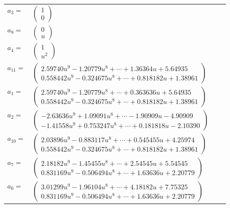 \documentclass[1p]{elsarticle_modified}
\theoremstyle{definition}
\begin{document}
\begin{tabular}{m{7pt} m{180pt} m{7pt} m{180pt} }
\flushright $a_{3}=$&$\begin{pmatrix}1\\0\end{pmatrix}$ \\
\flushright $a_{8}=$&$\begin{pmatrix}0\\u\end{pmatrix}$ \\
\flushright $a_{4}=$&$\begin{pmatrix}1\\u^2\end{pmatrix}$ \\
\flushright $a_{11}=$&$\begin{pmatrix}2.59740 u^{9}-1.20779 u^{8}+\cdots+1.36364 u+5.64935\\0.558442 u^{9}-0.324675 u^{8}+\cdots+0.818182 u+1.38961\end{pmatrix}$ \\
\flushright $a_{1}=$&$\begin{pmatrix}2.59740 u^{9}-1.20779 u^{8}+\cdots+0.363636 u+5.64935\\0.558442 u^{9}-0.324675 u^{8}+\cdots+0.818182 u+1.38961\end{pmatrix}$ \\
\flushright $a_{2}=$&$\begin{pmatrix}-2.63636 u^{9}+1.09091 u^{8}+\cdots-1.90909 u-4.90909\\-1.41558 u^{9}+0.753247 u^{8}+\cdots+0.181818 u-2.10390\end{pmatrix}$ \\
\flushright $a_{10}=$&$\begin{pmatrix}2.03896 u^{9}-0.883117 u^{8}+\cdots+0.545455 u+4.25974\\0.558442 u^{9}-0.324675 u^{8}+\cdots+0.818182 u+1.38961\end{pmatrix}$ \\
\flushright $a_{7}=$&$\begin{pmatrix}2.18182 u^{9}-1.45455 u^{8}+\cdots+2.54545 u+5.54545\\0.831169 u^{9}-0.506494 u^{8}+\cdots+1.63636 u+2.20779\end{pmatrix}$ \\
\flushright $a_{6}=$&$\begin{pmatrix}3.01299 u^{9}-1.96104 u^{8}+\cdots+4.18182 u+7.75325\\0.831169 u^{9}-0.506494 u^{8}+\cdots+1.63636 u+2.20779\end{pmatrix}$ \\

\end{tabular}
\end{document}
